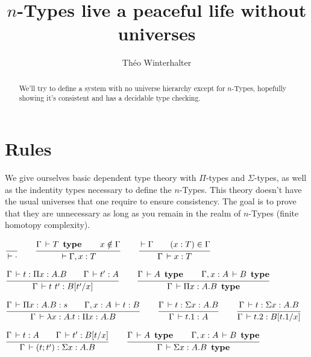 \documentclass[a4paper,english]{lipics-utf8x}
\title{$n$-Types live a peaceful life without universes}
\author[1]{Théo Winterhalter}
\begin{document}
  \maketitle

  \begin{abstract}
    We'll try to define a system with no universe hierarchy except for
    $n$-Types, hopefully showing it's consistent and has a decidable type
    checking.
  \end{abstract}

  \section{Rules}

  We give ourselves basic dependent type theory with $\Pi$-types and
  $\Sigma$-types, as well as the indentity types necessary to define the
  $n$-Types.
  This theory doesn't have the usual universes that one require to ensure
  consistency. The goal is to prove that they are unnecessary as long as you
  remain in the realm of $n$-Types (finite homotopy complexity).

  \begin{center}
  \(
    \ru{}{\der \cdot}
    \qquad
    \ru{\Gamma \der T \type \qquad
        x \notin \Gamma
      }{\der \Gamma, x : T}
    \qquad
    \ru{\der \Gamma \qquad
        (x : T) \in \Gamma
      }{\Gamma \der x : T}
  \)
  \end{center}

  \begin{center}
  \(
    \ru{\Gamma \der t : \Pi x:A.B \qquad
        \Gamma \der t' : A
      }{\Gamma \der t\ t' : B[t'/x]}
    \qquad
    \ru{\Gamma \der A \type \qquad
        \Gamma, x:A \der B \type
      }{\Gamma \der \Pi x:A.B \type}
  \)
  \end{center}

  \begin{center}
  \(
    \ru{\Gamma \der \Pi x:A.B : s \qquad
        \Gamma, x:A \der t : B
      }{\Gamma \der \lambda x:A.t : \Pi x:A.B}
    \qquad
    \ru{\Gamma \der t : \Sigma x:A.B
      }{\Gamma \der t.1 : A}
    \qquad
    \ru{\Gamma \der t : \Sigma x:A.B
      }{\Gamma \der t.2 : B[t.1/x]}
  \)
  \end{center}

  \begin{center}
  \(
    \ru{\Gamma \der t : A \qquad
        \Gamma \der t' : B[t/x]
      }{\Gamma \der (t ; t') : \Sigma x:A.B}
    \qquad
    \ru{\Gamma \der A \type \qquad
        \Gamma, x:A \der B \type
      }{\Gamma \der \Sigma x:A.B \type}
  \)
  \end{center}
\end{document}
